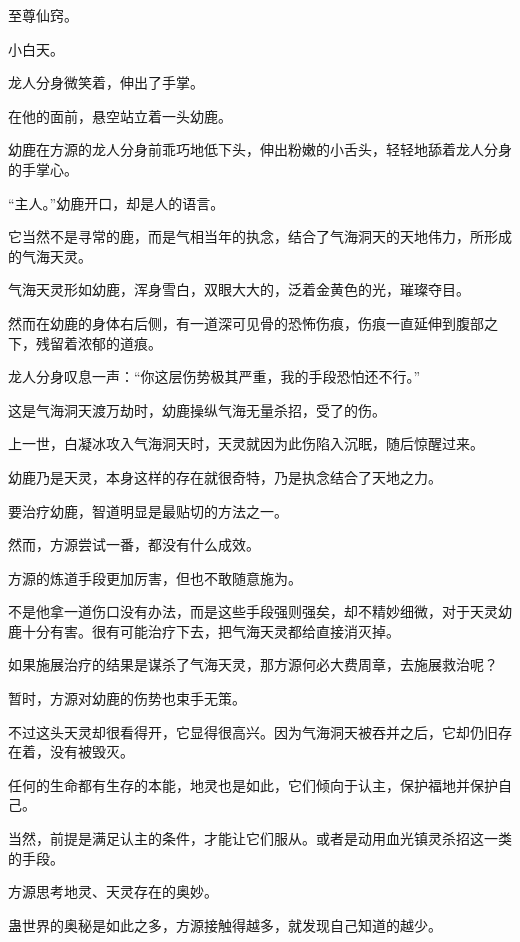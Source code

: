 
\begin{this_body}



至尊仙窍。

小白天。

龙人分身微笑着，伸出了手掌。

在他的面前，悬空站立着一头幼鹿。

幼鹿在方源的龙人分身前乖巧地低下头，伸出粉嫩的小舌头，轻轻地舔着龙人分身的手掌心。

“主人。”幼鹿开口，却是人的语言。

它当然不是寻常的鹿，而是气相当年的执念，结合了气海洞天的天地伟力，所形成的气海天灵。

气海天灵形如幼鹿，浑身雪白，双眼大大的，泛着金黄色的光，璀璨夺目。

然而在幼鹿的身体右后侧，有一道深可见骨的恐怖伤痕，伤痕一直延伸到腹部之下，残留着浓郁的道痕。

龙人分身叹息一声：“你这层伤势极其严重，我的手段恐怕还不行。”

这是气海洞天渡万劫时，幼鹿操纵气海无量杀招，受了的伤。

上一世，白凝冰攻入气海洞天时，天灵就因为此伤陷入沉眠，随后惊醒过来。

幼鹿乃是天灵，本身这样的存在就很奇特，乃是执念结合了天地之力。

要治疗幼鹿，智道明显是最贴切的方法之一。

然而，方源尝试一番，都没有什么成效。

方源的炼道手段更加厉害，但也不敢随意施为。

不是他拿一道伤口没有办法，而是这些手段强则强矣，却不精妙细微，对于天灵幼鹿十分有害。很有可能治疗下去，把气海天灵都给直接消灭掉。

如果施展治疗的结果是谋杀了气海天灵，那方源何必大费周章，去施展救治呢？

暂时，方源对幼鹿的伤势也束手无策。

不过这头天灵却很看得开，它显得很高兴。因为气海洞天被吞并之后，它却仍旧存在着，没有被毁灭。

任何的生命都有生存的本能，地灵也是如此，它们倾向于认主，保护福地并保护自己。

当然，前提是满足认主的条件，才能让它们服从。或者是动用血光镇灵杀招这一类的手段。

方源思考地灵、天灵存在的奥妙。

蛊世界的奥秘是如此之多，方源接触得越多，就发现自己知道的越少。


\end{this_body}
